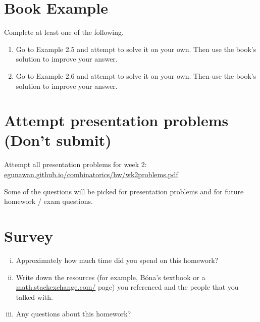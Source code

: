 \documentclass[12pt]{amsart}
\begin{document}
\section{Book Example}
Complete at least one of the following.


\begin{enumerate}
	\item 
	Go to Example 2.5 and attempt to solve it on your own. Then use the book's solution to improve your answer.
	
	\item
	Go to Example 2.6 and attempt to solve it on your own. Then use the book's solution to improve your answer.	
\end{enumerate}






\section*{Attempt presentation problems (Don't submit)}\label{sec:presentation}
Attempt all presentation problems for week 2:\\
\href{https://egunawan.github.io/combinatorics/hw/wk2problems.pdf}{egunawan.github.io/combinatorics/hw/wk2problems.pdf}



Some of the questions will be picked for presentation problems and for future homework / exam questions. 



\section{Survey}
\begin{enumerate}[i.] 
\item Approximately how much time did you spend on this homework?
\item Write down the resources (for example, B\'ona's textbook or a  \href{https://math.stackexchange.com/}{math.stackexchange.com/} page) you referenced and the people that you talked with.	
\item Any questions about this homework?
\end{enumerate}
\end{document}
